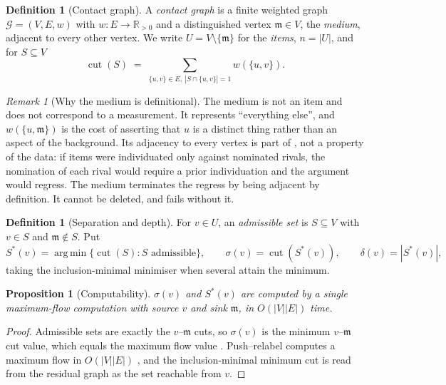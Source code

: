 \documentclass[11pt,a4paper]{article}
\newtheorem{proposition}[theorem]{Proposition}
\theoremstyle{definition}
\newtheorem{definition}[theorem]{Definition}
\theoremstyle{remark}
\newtheorem{remark}[theorem]{Remark}
\newcommand{\Gph}{\mathcal{G}}
\newcommand{\wt}{w}
\newcommand{\med}{\mathfrak{m}}
\newcommand{\cut}{\operatorname{cut}}
\newcommand{\sep}{\sigma}
\newcommand{\dep}{\delta}
\DeclareMathOperator*{\argmin}{arg\,min}
\begin{document}
\begin{definition}[Contact graph]\label{def:contact}
A \emph{contact graph} is a finite weighted graph $\Gph = (V,E,\wt)$ with
$\wt : E \to \mathbb{R}_{>0}$ and a distinguished vertex $\med \in V$,
the \emph{medium}, adjacent to every other vertex. We write
$U = V \setminus \{\med\}$ for the \emph{items}, $n = |U|$, and for
$S \subseteq V$
\[
\cut(S) \;=\; \sum_{\{u,v\} \in E,\ |S \cap \{u,v\}| = 1} \wt(\{u,v\}).
\]
\end{definition}

\begin{remark}[Why the medium is definitional]\label{rem:medium}
The medium is not an item and does not correspond to a measurement. It
represents ``everything else'', and $\wt(\{u,\med\})$ is the cost of
asserting that $u$ is a distinct thing rather than an aspect of the
background. Its adjacency to every vertex is part of
, not a property of the data: if items were
individuated only against nominated rivals, the nomination of each rival
would require a prior individuation and the argument would regress. The
medium terminates the regress by being adjacent by definition. It cannot
be deleted, and  fails without it.
\end{remark}

\begin{definition}[Separation and depth]\label{def:sep}
For $v \in U$, an \emph{admissible set} is $S \subseteq V$ with $v \in S$
and $\med \notin S$. Put
\[
S^{\ast}(v) = \argmin\{\cut(S) : S \text{ admissible}\},
\qquad
\sep(v) = \cut(S^{\ast}(v)),
\qquad
\dep(v) = |S^{\ast}(v)| ,
\]
taking the inclusion-minimal minimiser when several attain the minimum.
\end{definition}

\begin{proposition}[Computability]\label{prop:computable}
$\sep(v)$ and $S^{\ast}(v)$ are computed by a single maximum-flow
computation with source $v$ and sink $\med$, in $O(|V||E|)$ time.
\end{proposition}

\begin{proof}
Admissible sets are exactly the $v$--$\med$ cuts, so $\sep(v)$ is the
minimum $v$--$\med$ cut value, which equals the maximum flow value
\citep{fordfulkerson1956,menger1927}. Push--relabel computes a maximum
flow in $O(|V||E|)$ \citep{goldberg1988new}, and the inclusion-minimal
minimum cut is read from the residual graph as the set reachable from
$v$.
\end{proof}
\end{document}
